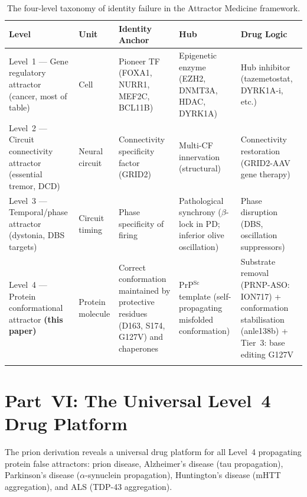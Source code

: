 \documentclass[12pt,a4paper]{article}
\newcommand{\prpsc}{PrP$^{\mathrm{Sc}}$}
\begin{document}
\begin{longtable}{p{3.2cm} p{2.5cm} p{3cm} p{2.5cm} p{3.2cm}}
  \toprule
  \textbf{Level} & \textbf{Unit} & \textbf{Identity Anchor} &
  \textbf{Hub} & \textbf{Drug Logic} \\
  \midrule
  Level~1 --- Gene regulatory attractor (cancer, most of table) &
  Cell &
  Pioneer TF (FOXA1, NURR1, MEF2C, BCL11B) &
  Epigenetic enzyme (EZH2, DNMT3A, HDAC, DYRK1A) &
  Hub inhibitor (tazemetostat, DYRK1A-i, etc.) \\
  \addlinespace
  Level~2 --- Circuit connectivity attractor (essential tremor, DCD) &
  Neural circuit &
  Connectivity specificity factor (GRID2) &
  Multi-CF innervation (structural) &
  Connectivity restoration (GRID2-AAV gene therapy) \\
  \addlinespace
  Level~3 --- Temporal/phase attractor (dystonia, DBS targets) &
  Circuit timing &
  Phase specificity of firing &
  Pathological synchrony ($\beta$-lock in PD; inferior olive oscillation) &
  Phase disruption (DBS, oscillation suppressors) \\
  \addlinespace
  Level~4 --- Protein conformational attractor \textbf{(this paper)} &
  Protein molecule &
  Correct conformation maintained by protective residues (D163, S174, G127V) and chaperones &
  \prpsc{} template (self-propagating misfolded conformation) &
  Substrate removal (PRNP-ASO: ION717) + conformation stabilisation (anle138b) + Tier~3: base editing G127V \\
  \bottomrule
  \caption{The four-level taxonomy of identity failure in the Attractor
    Medicine framework.}
\end{longtable}

\section{Part~VI: The Universal Level~4 Drug Platform}

The prion derivation reveals a universal drug platform for all Level~4
propagating protein false attractors: prion disease, Alzheimer's disease
(tau propagation), Parkinson's disease ($\alpha$-synuclein propagation),
Huntington's disease (mHTT aggregation), and ALS (TDP-43 aggregation).
\end{document}
